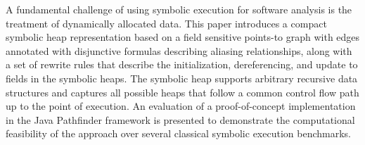 
A fundamental challenge of using symbolic execution for software
analysis is the treatment of dynamically allocated data. This paper
introduces a compact symbolic heap representation based on a field
sensitive points-to graph with edges annotated with disjunctive
formulas describing aliasing relationships, along with a set of
rewrite rules that describe the initialization, dereferencing, and
update to fields in the symbolic heaps. The symbolic heap supports
arbitrary recursive data structures and captures all possible heaps
that follow a common control flow path up to the point of
execution. An evaluation of a proof-of-concept implementation in the
Java Pathfinder framework is presented to demonstrate the
computational feasibility of the approach over several classical
symbolic execution benchmarks.


